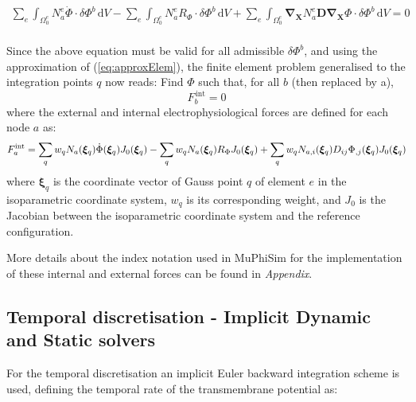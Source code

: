 \documentclass[oneside,11pt,times]{book}
\begin{document}
%
\begin{equation} \label{equationGlobalWeakFormElectro}
 \begin{split}
 \sum_e \int_{\Omega_{0}^e} N^e_a \dot{\Phi} \cdot \delta\Phi^b\, \text{d} V -  \sum_e \int_{\Omega_{0}^e} N^e_a R_{\Phi}\cdot \delta\Phi^b\, \text{d} V   + \sum_e \int_{\Omega_{0}^e} \bm{\nabla_X} N_a^e \bm{D} \bm{\nabla_X}\Phi \cdot \delta\Phi^b\, \text{d} V =0
 \end{split}
\end{equation}
%
\\
Since the above equation must be valid for all admissible $ \delta\Phi^b$, and using the approximation of (\ref{eq:approxElem}), the finite element problem generalised to the integration points $q$ now reads: Find ${\Phi}$ such that, for all $b$ (then replaced by a),
%
\begin{equation} \label{equationResPhi}
{F}_{b}^{\,\text{int}} = 0
\end{equation}
%
where the external and internal electrophysiological forces are defined for each node $a$ as:\\

\begin{equation}
\begin{aligned}
\centering
{F}^{\text{int}}_a=\sum_q w_q N_a(\bm{\xi}_q)\dot{\Phi}(\bm{\xi}_q)J_0(\bm{\xi}_q)  - \sum_q w_q  N_a(\bm{\xi}_q) R_{\Phi} J_0(\bm{\xi}_q)+ \sum_q w_q  N_{a,i}(\bm{\xi}_q) D_{ij} \Phi_{,j}(\bm{\xi}_q) J_0(\bm{\xi}_q)
\end{aligned}
\label{equationFintElem}
\end{equation}
%
where $\bm{\xi}_q$ is the coordinate vector of Gauss point $q$ of element $e$ in the isoparametric coordinate system, $w_q$ is its corresponding weight, and $J_0$ is the Jacobian between the isoparametric coordinate system and the reference configuration.

More details about the index notation used in MuPhiSim for the implementation of these internal and external forces can be found in \textit{Appendix}.

\subsection{Temporal discretisation - Implicit Dynamic and Static solvers}

For the temporal discretisation an implicit Euler backward integration scheme is used, defining the temporal rate of the transmembrane potential as:
\end{document}
